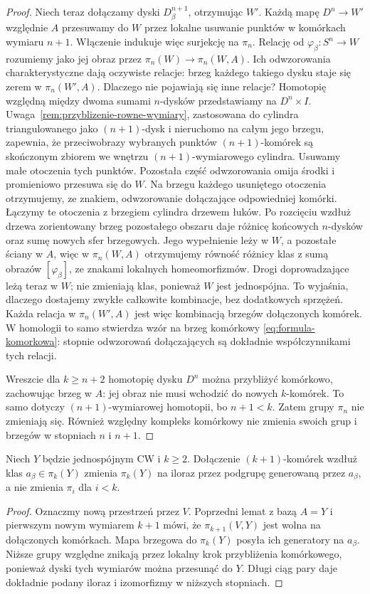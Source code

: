 \begin{proof}
Niech teraz dołączamy dyski $D^{n+1}_\beta$, otrzymując $W'$.
Każdą mapę $D^n\to W'$ względnie $A$ przesuwamy do $W$
przez lokalne usuwanie punktów w komórkach wymiaru $n+1$.
Włączenie indukuje więc surjekcję na $\pi_n$.
Relację od $\varphi_\beta:S^n\to W$ rozumiemy jako jej obraz
przez $\pi_n(W)\to\pi_n(W,A)$.
Ich odwzorowania charakterystyczne
dają oczywiste relacje:
brzeg każdego takiego
dysku staje się zerem
w $\pi_n(W',A)$.
Dlaczego nie pojawiają
się inne relacje?
Homotopię względną
między dwoma sumami
$n$-dysków przedstawiamy
na $D^n\times I$.
Uwaga~\ref{rem:przyblizenie-rowne-wymiary}, zastosowana do cylindra
triangulowanego jako $(n+1)$-dysk i nieruchomo na całym jego brzegu,
zapewnia, że przeciwobrazy wybranych punktów $(n+1)$-komórek
są skończonym zbiorem
we wnętrzu $(n+1)$-wymiarowego
cylindra. Usuwamy małe
otoczenia tych punktów.
Pozostała część odwzorowania
omija środki i promieniowo
przesuwa się do $W$.
Na brzegu każdego
usuniętego otoczenia
otrzymujemy, ze znakiem,
odwzorowanie dołączające
odpowiedniej komórki.
Łączymy te otoczenia z brzegiem cylindra drzewem łuków.
Po rozcięciu wzdłuż drzewa zorientowany brzeg pozostałego obszaru
daje różnicę końcowych $n$-dysków oraz sumę nowych sfer brzegowych.
Jego wypełnienie leży w $W$, a pozostałe ściany w $A$,
więc w $\pi_n(W,A)$ otrzymujemy równość różnicy klas z sumą
obrazów $[\varphi_\beta]$, ze znakami lokalnych homeomorfizmów.
Drogi doprowadzające leżą teraz w $W$; nie zmieniają klas,
ponieważ $W$ jest jednospójna. To wyjaśnia, dlaczego dostajemy
zwykłe całkowite kombinacje, bez dodatkowych sprzężeń.
Każda relacja w
$\pi_n(W',A)$
jest więc kombinacją
brzegów dołączonych
komórek.
W homologii to samo
stwierdza wzór
na brzeg komórkowy
\eqref{eq:formula-komorkowa}:
stopnie odwzorowań dołączających
są dokładnie
współczynnikami
tych relacji.

Wreszcie dla $k\geq n+2$
homotopię dysku $D^n$
można przybliżyć
komórkowo, zachowując
brzeg w $A$: jej obraz
nie musi wchodzić
do nowych $k$-komórek.
To samo dotyczy
$(n+1)$-wymiarowej
homotopii, bo $n+1<k$.
Zatem grupy $\pi_n$
nie zmieniają się.
Również względny
kompleks komórkowy
nie zmienia swoich
grup i brzegów
w stopniach $n$ i $n+1$.
\end{proof}

\begin{wniosek}
\label{cor:zabijanie-klas-pi}
Niech $Y$ będzie jednospójnym CW i $k\geq2$.
Dołączenie $(k+1)$-komórek wzdłuż klas $a_\beta\in\pi_k(Y)$
zmienia $\pi_k(Y)$ na iloraz przez podgrupę generowaną przez $a_\beta$,
a nie zmienia $\pi_i$ dla $i<k$.
\end{wniosek}
\begin{proof}
Oznaczmy nową przestrzeń przez $V$. Poprzedni lemat z bazą $A=Y$
i pierwszym nowym wymiarem $k+1$ mówi, że
$\pi_{k+1}(V,Y)$ jest wolna na dołączonych komórkach.
Mapa brzegowa do $\pi_k(Y)$ posyła ich generatory na $a_\beta$.
Niższe grupy względne znikają przez lokalny krok przybliżenia
komórkowego, ponieważ dyski tych wymiarów można przesunąć do $Y$.
Długi ciąg pary daje dokładnie podany iloraz i izomorfizmy w niższych stopniach.
\end{proof}

